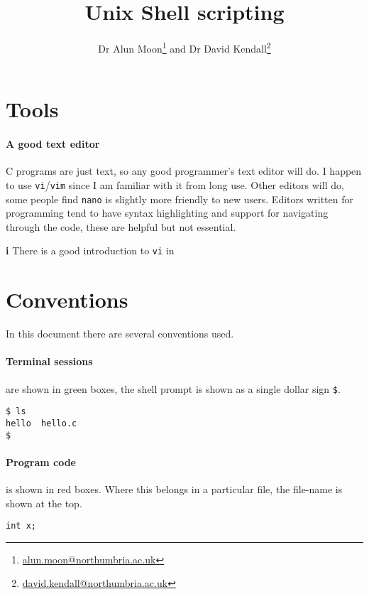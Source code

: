 \documentclass[12pt,a4paper]{article}
\title{Unix Shell scripting}
\author{Dr Alun Moon\thanks{\url{alun.moon@northumbria.ac.uk}} and 
	Dr David Kendall\thanks{\url{david.kendall@northumbria.ac.uk}}}
\begin{document}
\maketitle

\section{Tools}

\paragraph{A good text editor} C programs are just text, so any
good programmer's text editor will do.  I happen to use \verb'vi'/\verb'vim'
since I am familiar with it from long use.  Other editors will do, some people
find \verb'nano' is slightly more friendly to new users.  Editors written for
programming tend to have syntax highlighting and support for navigating through
the code, these are helpful but not essential.

\begin{note}{\Large\textbf i}
	There is a good introduction to \texttt{vi} in \cite[chapter 12]{Shotts}
\end{note}

\section{Conventions}
In this document there are several conventions used.

\paragraph{Terminal sessions} are shown in green boxes, the shell prompt is
shown as a single dollar sign \verb'$'.
\begin{terminal}
\begin{verbatim}
$ ls
hello  hello.c
$
\end{verbatim}
\end{terminal}

\paragraph{Program code} is shown in red boxes.  Where this belongs in a
particular file, the file-name is shown at the top.
\begin{code}[title=filename.c]
\begin{verbatim}
int x;
\end{verbatim}
\end{code}
\end{document}
